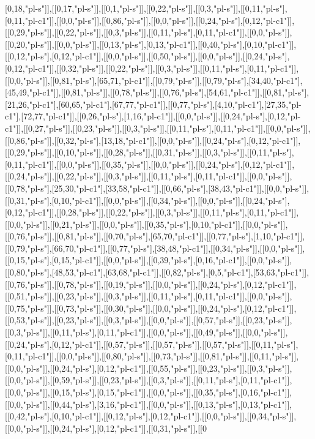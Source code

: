 [0,18,"pl-s"]],[[0,17,"pl-s"]],[[0,1,"pl-s"]],[[0,22,"pl-s"]],[[0,3,"pl-s"]],[[0,11,"pl-s"],[0,11,"pl-c1"]],[[0,0,"pl-s"]],[[0,86,"pl-s"]],[[0,0,"pl-s"]],[[0,24,"pl-s"],[0,12,"pl-c1"]],[[0,29,"pl-s"]],[[0,22,"pl-s"]],[[0,3,"pl-s"]],[[0,11,"pl-s"],[0,11,"pl-c1"]],[[0,0,"pl-s"]],[[0,20,"pl-s"]],[[0,0,"pl-s"]],[[0,13,"pl-s"],[0,13,"pl-c1"]],[[0,40,"pl-s"],[0,10,"pl-c1"]],[[0,12,"pl-s"],[0,12,"pl-c1"]],[[0,0,"pl-s"]],[[0,50,"pl-s"]],[[0,0,"pl-s"]],[[0,24,"pl-s"],[0,12,"pl-c1"]],[[0,32,"pl-s"]],[[0,22,"pl-s"]],[[0,3,"pl-s"]],[[0,11,"pl-s"],[0,11,"pl-c1"]],[[0,0,"pl-s"]],[[0,81,"pl-s"],[65,71,"pl-c1"]],[[0,79,"pl-s"]],[[0,79,"pl-s"],[34,40,"pl-c1"],[45,49,"pl-c1"]],[[0,81,"pl-s"]],[[0,78,"pl-s"]],[[0,76,"pl-s"],[54,61,"pl-c1"]],[[0,81,"pl-s"],[21,26,"pl-c1"],[60,65,"pl-c1"],[67,77,"pl-c1"]],[[0,77,"pl-s"],[4,10,"pl-c1"],[27,35,"pl-c1"],[72,77,"pl-c1"]],[[0,26,"pl-s"],[1,16,"pl-c1"]],[[0,0,"pl-s"]],[[0,24,"pl-s"],[0,12,"pl-c1"]],[[0,27,"pl-s"]],[[0,23,"pl-s"]],[[0,3,"pl-s"]],[[0,11,"pl-s"],[0,11,"pl-c1"]],[[0,0,"pl-s"]],[[0,86,"pl-s"]],[[0,32,"pl-s"],[13,18,"pl-c1"]],[[0,0,"pl-s"]],[[0,24,"pl-s"],[0,12,"pl-c1"]],[[0,29,"pl-s"]],[[0,10,"pl-s"]],[[0,28,"pl-s"]],[[0,31,"pl-s"]],[[0,3,"pl-s"]],[[0,11,"pl-s"],[0,11,"pl-c1"]],[[0,0,"pl-s"]],[[0,35,"pl-s"]],[[0,0,"pl-s"]],[[0,24,"pl-s"],[0,12,"pl-c1"]],[[0,24,"pl-s"]],[[0,22,"pl-s"]],[[0,3,"pl-s"]],[[0,11,"pl-s"],[0,11,"pl-c1"]],[[0,0,"pl-s"]],[[0,78,"pl-s"],[25,30,"pl-c1"],[33,58,"pl-c1"]],[[0,66,"pl-s"],[38,43,"pl-c1"]],[[0,0,"pl-s"]],[[0,31,"pl-s"],[0,10,"pl-c1"]],[[0,0,"pl-s"]],[[0,34,"pl-s"]],[[0,0,"pl-s"]],[[0,24,"pl-s"],[0,12,"pl-c1"]],[[0,28,"pl-s"]],[[0,22,"pl-s"]],[[0,3,"pl-s"]],[[0,11,"pl-s"],[0,11,"pl-c1"]],[[0,0,"pl-s"]],[[0,21,"pl-s"]],[[0,0,"pl-s"]],[[0,35,"pl-s"],[0,10,"pl-c1"]],[[0,0,"pl-s"]],[[0,76,"pl-s"]],[[0,81,"pl-s"]],[[0,70,"pl-s"],[65,70,"pl-c1"]],[[0,77,"pl-s"],[1,10,"pl-c1"]],[[0,79,"pl-s"],[66,70,"pl-c1"]],[[0,77,"pl-s"],[38,48,"pl-c1"]],[[0,34,"pl-s"]],[[0,0,"pl-s"]],[[0,15,"pl-s"],[0,15,"pl-c1"]],[[0,0,"pl-s"]],[[0,39,"pl-s"],[0,16,"pl-c1"]],[[0,0,"pl-s"]],[[0,80,"pl-s"],[48,53,"pl-c1"],[63,68,"pl-c1"]],[[0,82,"pl-s"],[0,5,"pl-c1"],[53,63,"pl-c1"]],[[0,76,"pl-s"]],[[0,78,"pl-s"]],[[0,19,"pl-s"]],[[0,0,"pl-s"]],[[0,24,"pl-s"],[0,12,"pl-c1"]],[[0,51,"pl-s"]],[[0,23,"pl-s"]],[[0,3,"pl-s"]],[[0,11,"pl-s"],[0,11,"pl-c1"]],[[0,0,"pl-s"]],[[0,75,"pl-s"]],[[0,73,"pl-s"]],[[0,30,"pl-s"]],[[0,0,"pl-s"]],[[0,24,"pl-s"],[0,12,"pl-c1"]],[[0,53,"pl-s"]],[[0,23,"pl-s"]],[[0,3,"pl-s"]],[[0,0,"pl-s"]],[[0,57,"pl-s"]],[[0,23,"pl-s"]],[[0,3,"pl-s"]],[[0,11,"pl-s"],[0,11,"pl-c1"]],[[0,0,"pl-s"]],[[0,49,"pl-s"]],[[0,0,"pl-s"]],[[0,24,"pl-s"],[0,12,"pl-c1"]],[[0,57,"pl-s"]],[[0,57,"pl-s"]],[[0,57,"pl-s"]],[[0,11,"pl-s"],[0,11,"pl-c1"]],[[0,0,"pl-s"]],[[0,80,"pl-s"]],[[0,73,"pl-s"]],[[0,81,"pl-s"]],[[0,11,"pl-s"]],[[0,0,"pl-s"]],[[0,24,"pl-s"],[0,12,"pl-c1"]],[[0,55,"pl-s"]],[[0,23,"pl-s"]],[[0,3,"pl-s"]],[[0,0,"pl-s"]],[[0,59,"pl-s"]],[[0,23,"pl-s"]],[[0,3,"pl-s"]],[[0,11,"pl-s"],[0,11,"pl-c1"]],[[0,0,"pl-s"]],[[0,15,"pl-s"],[0,15,"pl-c1"]],[[0,0,"pl-s"]],[[0,35,"pl-s"],[0,16,"pl-c1"]],[[0,0,"pl-s"]],[[0,44,"pl-s"],[3,16,"pl-c1"]],[[0,0,"pl-s"]],[[0,13,"pl-s"],[0,13,"pl-c1"]],[[0,42,"pl-s"],[0,10,"pl-c1"]],[[0,12,"pl-s"],[0,12,"pl-c1"]],[[0,0,"pl-s"]],[[0,34,"pl-s"]],[[0,0,"pl-s"]],[[0,24,"pl-s"],[0,12,"pl-c1"]],[[0,31,"pl-s"]],[[0